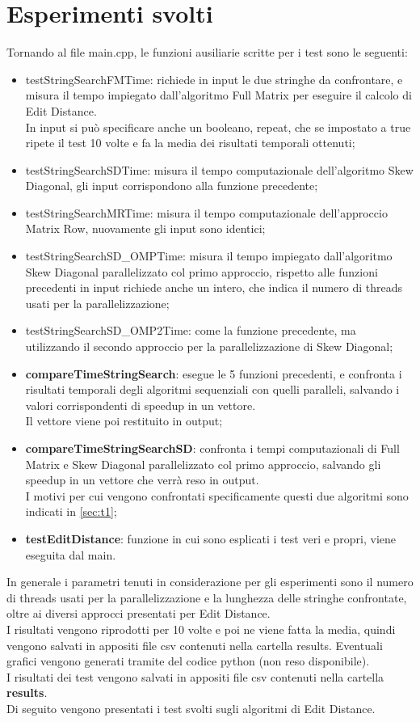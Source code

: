 \documentclass[10pt,twocolumn,letterpaper]{article}
\newcommand{\bit} {\begin{itemize} }
\newcommand{\eit} {\end{itemize} }
\begin{document}
\section{Esperimenti svolti}
\label{sec:exp}
Tornando al file main.cpp, le funzioni ausiliarie scritte per i test sono le seguenti:

\bit
    \item{testStringSearchFMTime: richiede in input le due stringhe da confrontare, e misura il tempo impiegato dall'algoritmo Full Matrix per eseguire il calcolo di Edit Distance.\\ In input si può specificare anche un booleano, repeat, che se impostato a true ripete il test 10 volte e fa la media dei risultati temporali ottenuti;}
    \item{testStringSearchSDTime: misura il tempo computazionale dell'algoritmo Skew Diagonal, gli input corrispondono alla funzione precedente;}
    \item{testStringSearchMRTime: misura il tempo computazionale dell'approccio Matrix Row, nuovamente gli input sono identici;}
    \item{testStringSearchSD\_OMPTime: misura il tempo impiegato dall'algoritmo Skew Diagonal parallelizzato col primo approccio, rispetto alle funzioni precedenti in input richiede anche un intero, che indica il numero di threads usati per la parallelizzazione;}
    \item{testStringSearchSD\_OMP2Time: come la funzione precedente, ma utilizzando il secondo approccio per la parallelizzazione di Skew Diagonal;}
    \item{\textbf{compareTimeStringSearch}: esegue le 5 funzioni precedenti, e confronta i risultati temporali degli algoritmi sequenziali con quelli paralleli, salvando i valori corrispondenti di speedup in un vettore.\\
    Il vettore viene poi restituito in output;}
    \item{\textbf{compareTimeStringSearchSD}: confronta i tempi computazionali di Full Matrix e Skew Diagonal parallelizzato col primo approccio, salvando gli speedup in un vettore che verrà reso in output.\\
    I motivi per cui vengono confrontati specificamente questi due algoritmi sono indicati in \cref{sec:t1};}
    \item{\textbf{testEditDistance}: funzione in cui sono esplicati i test veri e propri, viene eseguita dal main.}
\eit

In generale i parametri tenuti in considerazione per gli esperimenti sono il numero di threads usati per la parallelizzazione e la lunghezza delle stringhe confrontate, oltre ai diversi approcci presentati per Edit Distance.\\
I risultati vengono riprodotti per 10 volte e poi ne viene fatta la media, quindi vengono salvati in appositi file csv contenuti nella cartella results. Eventuali grafici vengono generati tramite del codice python (non reso disponibile).\\
I risultati dei test vengono salvati in appositi file csv contenuti nella cartella \textbf{results}.\\
Di seguito vengono presentati i test svolti sugli algoritmi di Edit Distance.
\end{document}
